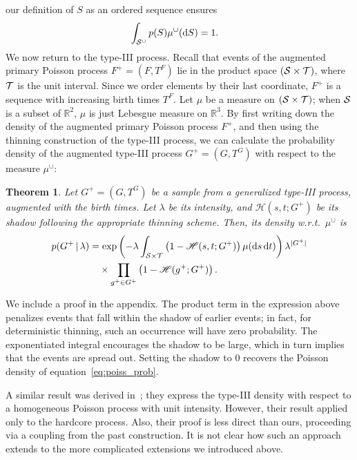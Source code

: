 \documentclass{statsoc}
\newtheorem{thrm}[defn]{Theorem}
\begin{document}
our definition of $S$ as an ordered sequence ensures %
\begin{align}
  \int_{\mathcal{S}^{\cup}} p(S) \mu^{\cup}(\mathrm{d} S) &= 1.
\end{align}
We now return to the \matern type-III process. Recall that events of the augmented primary Poisson process ${F^{+} = (F, T^F)}$ lie in the product space
$({\mathcal S} \times {\mathcal T})$, where ${\mathcal T}$ is the unit interval. %
Since we order elements by their last coordinate, $F^+$ is a sequence with increasing birth times $T^F$.
Let $\mu$ be a measure on $({\mathcal S} \times {\mathcal T})$; when ${\mathcal S}$ is a subset of $\mathbb{R}^2$, $\mu$ is just 
Lebesgue measure on $\mathbb{R}^3$. 
By first writing down the density of the augmented primary Poisson process $F^+$, and then using the thinning construction of the 
\matern type-III process, we can calculate the probability density of the augmented \matern type-III process ${G^{+} = (G, T^G)}$ with respect to the 
measure ${\mu}^{\cup}$:
\begin{thrm}  \label{thrm:mat_dens} Let $G^+ = (G, T^G)$ be a sample from a generalized \matern type-III process, augmented with the birth 
  times. Let $\lambda$ be its intensity, and $\mathscr{H}(s,t;G^+)$ be its shadow following the appropriate thinning scheme. %
Then, its density w.r.t.\  ${\mu}^{\cup}$ is 
\begin{align}
 p(G^+ \,|\, \lambda) &=\exp\left(-\lambda \int_{{\mathcal S} \times {\mathcal T}}\left( 1 - \mathscr{H}(s,t;G^+)\right)\mu(\mathrm{d} s \,\mathrm{d} t)\right)
              \lambda^{|G^+|}  \nonumber \\
         & \quad \times  \prod_{g^+ \in G^+} \left( 1 - \mathscr{H}(g^+;G^+) \right).
\label{eq:mat_marg_prob}
\end{align}
\end{thrm}
We include a proof in the appendix. 
The product term in the expression above penalizes \matern events that fall within the shadow of earlier events; in fact, for deterministic thinning, such
an occurrence will have zero probability. The exponentiated integral encourages the shadow to be large, which in turn implies that the events are 
spread out. Setting the shadow to $0$ recovers the Poisson density of equation~\eqref{eq:poiss_prob}.

A similar result was derived in~\cite{Hube:Wolp:2009}; they express the \matern type-III density with respect to a homogeneous Poisson 
process with unit intensity. However, their result applied only to the hardcore process. Also, their proof is less direct than ours, proceeding 
via a coupling from the past construction. It is not clear
how such an approach extends to the more complicated extensions we introduced above.
\end{document}

